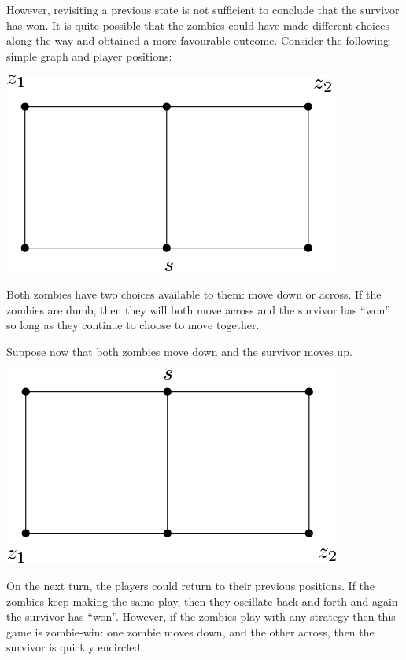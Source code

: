\documentclass[letterpaper, 10pt]{article}
\begin{document}
However, revisiting a previous state is not sufficient to conclude that the survivor
has won. It is quite possible that the zombies could have made different choices
along the way and obtained a more favourable outcome. Consider the following
simple graph and player positions:

\begin{center}
 \includegraphics[scale=0.40]{diagram1}
\end{center}

Both zombies have two choices available to them: move down or across.
If the zombies are dumb, then they will both move across and the survivor has
``won'' so long as they continue to choose to move together.

Suppose now that both zombies move down and the survivor moves up.

\begin{center}
 \includegraphics[scale=0.40]{diagram2}
\end{center}

On the next turn, the players could return to their previous positions.
If the zombies keep making the same play, then they oscillate back and forth and
again the survivor has ``won''.
However, if the zombies play with any strategy then this game is zombie-win:
one zombie moves down, and the other across, then the survivor is quickly encircled.
\end{document}

